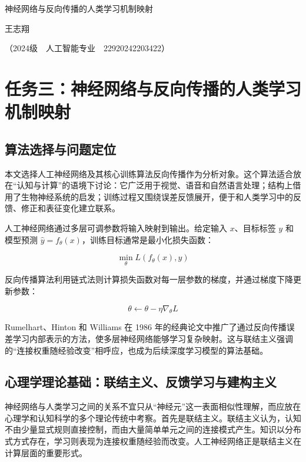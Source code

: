 \documentclass[UTF8,zihao=5,a4paper]{ctexart}
\begin{document}
\clearpage

{\centering{}\heiti 神经网络与反向传播的人类学习机制映射\par}
\vspace{2\baselineskip}
{\centering{}\songti 王志翔\par}
{\centering{}\songti （2024级~~人工智能专业~~22920242203422）\par}
\vspace{\baselineskip}

\section{任务三：神经网络与反向传播的人类学习机制映射}

\subsection{算法选择与问题定位}

本文选择人工神经网络及其核心训练算法反向传播作为分析对象。这个算法适合放在“认知与计算”的语境下讨论：它广泛用于视觉、语音和自然语言处理；结构上借用了生物神经系统的启发；训练过程又围绕误差反馈展开，便于和人类学习中的反馈、修正和表征变化建立联系。

人工神经网络通过多层可调参数将输入映射到输出。给定输入 $x$、目标标签 $y$ 和模型预测 $\hat{y}=f_\theta(x)$，训练目标通常是最小化损失函数：

$$
\min_\theta L(f_\theta(x),y)
$$

反向传播算法利用链式法则计算损失函数对每一层参数的梯度，并通过梯度下降更新参数：

$$
\theta \leftarrow \theta - \eta \nabla_\theta L
$$

Rumelhart、Hinton 和 Williams 在 1986 年的经典论文中推广了通过反向传播误差学习内部表示的方法，使多层神经网络能够学习复杂映射\cite{rumelhart1986backprop}。这与联结主义强调的“连接权重随经验改变”相呼应，也成为后续深度学习模型的算法基础。

\subsection{心理学理论基础：联结主义、反馈学习与建构主义}

神经网络与人类学习之间的关系不宜只从“神经元”这一表面相似性理解，而应放在心理学和认知科学的多个理论传统中考察。首先是联结主义。联结主义认为，认知不由少量显式规则直接控制，而由大量简单单元之间的连接模式产生。知识以分布式方式存在，学习则表现为连接权重随经验而改变。人工神经网络正是联结主义在计算层面的重要形式。
\end{document}
